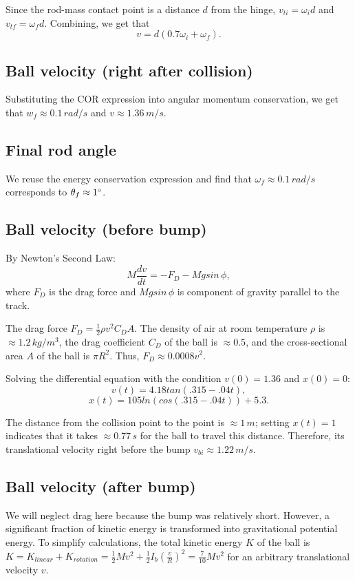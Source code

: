 \documentclass[12pt]{article} %
\begin{document}
Since the rod-mass contact point is a distance $d$ from the hinge, $v_{ti} = \omega_i d$ and $v_{tf} = \omega_f d$. Combining, we get that $$v = d(0.7\omega_i + \omega_f).$$

\subsection{Ball velocity (right after collision)}

Substituting the COR expression into angular momentum conservation, we get that $w_f \approx 0.1\,rad/s$ and $v \approx 1.36\,m/s$.

\subsection{Final rod angle}

We reuse the energy conservation expression and find that $\omega_f \approx 0.1\,rad/s$ corresponds to $\theta_f \approx 1\degree$.

\subsection{Ball velocity (before bump)}

By Newton's Second Law:
$$M \frac{dv}{dt} = -F_D - Mgsin\,\phi,$$
where $F_D$ is the drag force and $Mgsin\,\phi$ is component of gravity parallel to the track.

The drag force $F_D = \frac{1}{2}\rho v^2 C_D A$. The density of air at room temperature $\rho$ is $\approx 1.2\,kg/m^3$, the drag coefficient $C_D$ of the ball is $\approx 0.5$, and the cross-sectional area $A$ of the ball is $\pi R^2$.
Thus, $F_D \approx 0.0008v^2$.

Solving the differential equation with the condition $v(0) = 1.36$ and $x(0) = 0$: $$v(t) = 4.18tan(.315 - .04t),$$ $$x(t) = 105ln(cos(.315 - .04t)) + 5.3.$$

The distance from the collision point to the point is $\approx 1\, m$; setting $x(t) = 1$ indicates that it takes $\approx 0.77\,s$ for the ball to travel this distance. Therefore, its translational velocity right before the bump $v_{bi} \approx 1.22\,m/s$.

\subsection{Ball velocity (after bump)}

We will neglect drag here because the bump was relatively short.
However, a significant fraction of kinetic energy is transformed into gravitational potential energy.
To simplify calculations, the total kinetic energy $K$ of the ball is $K = K_{linear} + K_{rotation} = \frac{1}{2}Mv^2 + \frac{1}{2}I_b(\frac{v}{R})^2 = \frac{7}{10}Mv^2$ for an arbitrary translational velocity $v$.
\end{document}
